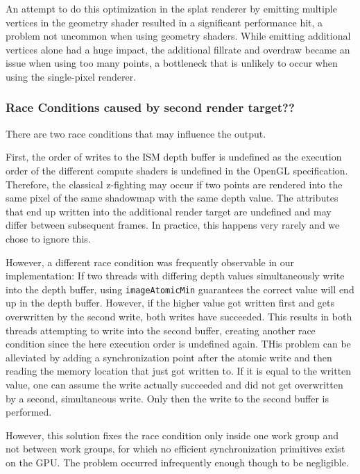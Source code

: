 
An attempt to do this optimization in the splat renderer by emitting multiple vertices in the geometry shader resulted in a significant performance hit, a problem not uncommon when using geometry shaders. While emitting additional vertices alone had a huge impact, the additional fillrate and overdraw became an issue when using too many points, a bottleneck that is unlikely to occur when using the single-pixel renderer.


\subsubsection{Race Conditions caused by second render target??}

There are two race conditions that may influence the output.

First, the order of writes to the ISM depth buffer is undefined as the execution order of the different compute shaders is undefined in the OpenGL specification. Therefore, the classical z-fighting may occur if two points are rendered into the same pixel of the same shadowmap with the same depth value. The attributes that end up written into the additional render target are undefined and may differ between subsequent frames. In practice, this happens very rarely and we chose to ignore this.

However, a different race condition was frequently observable in our implementation:
If two threads with differing depth values simultaneously write into the depth buffer, using \texttt{imageAtomicMin} guarantees the correct value will end up in the depth buffer. However, if the higher value got written first and gets overwritten by the second write, both writes have succeeded. This results in both threads attempting to write into the second buffer, creating another race condition since the here execution order is undefined again. THis problem can be alleviated by adding a synchronization point after the atomic write and then reading the memory location that just got written to. If it is equal to the written value, one can assume the write actually succeeded and did not get overwritten by a second, simultaneous write. Only then the write to the second buffer is performed.

However, this solution fixes the race condition only inside one work group and not between work groups, for which no efficient synchronization primitives exist on the GPU. The problem occurred infrequently enough though to be negligible.

